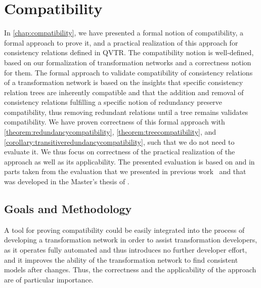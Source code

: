 \section{Compatibility}
\label{chap:correctness_evaluation:compatibility}

In \autoref{chap:compatibility}, we have presented a formal notion of compatibility, a formal approach to prove it, and a practical realization of this approach for consistency relations defined in \gls{QVTR}.
The compatibility notion is well-defined, based on our formalization of transformation networks and a correctness notion for them.
The formal approach to validate compatibility of consistency relations of a transformation network is based on the insights that specific consistency relation trees are inherently compatible and that the addition and removal of consistency relations fulfilling a specific notion of redundancy preserve compatibility, thus removing redundant relations until a tree remains validates compatibility.
We have proven correctness of this formal approach with \autoref{theorem:redundancycompatibility}, \autoref{theorem:treecompatibility}, and \autoref{corollary:transitiveredundancycompatibility}, such that we do not need to evaluate it.
We thus focus on correctness of the practical realization of the approach as well as its applicability.
The presented evaluation is based on and in parts taken from the evaluation that we presented in previous work~ and that was developed in the Master's thesis of .


\subsection{Goals and Methodology}

A tool for proving compatibility could be easily integrated into the process of developing a transformation network in order to assist transformation developers, as it operates fully automated and thus introduces no further developer effort, and it improves the ability of the transformation network to find consistent models after changes.
Thus, the correctness and the applicability of the approach are of particular importance.

